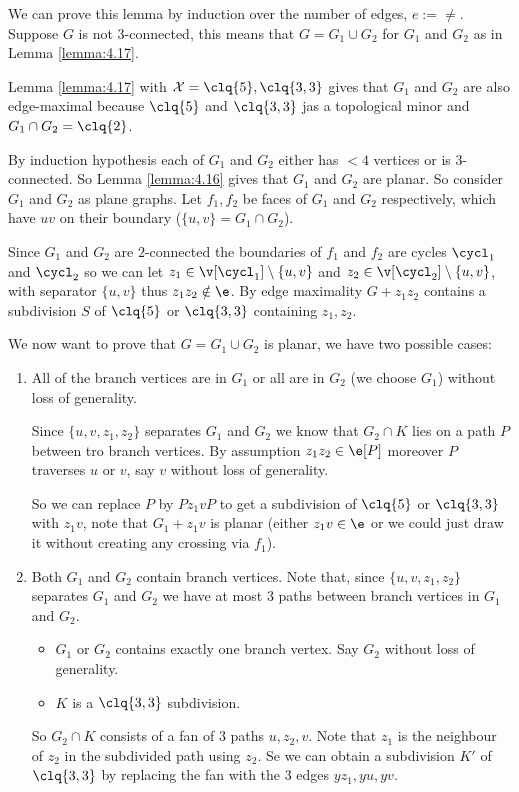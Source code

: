 \begin{prf}
    We can prove this lemma by induction over the number of edges, $e := \ne$. Suppose $G$ is not $3$-connected, this means that $G = G_1 \cup G_2$ for $G_1$ and $G_2$ as in Lemma \ref{lemma:4.17}.

    Lemma \ref{lemma:4.17} with $\mathcal{X} = {\clq{5}, \clq{3, 3}}$ gives that $G_1$ and $G_2$ are also edge-maximal because $\clq{5}$ and $\clq{3, 3}$ jas a topological minor and $G_1 \cap G_2 = \clq{2}$.

    By induction hypothesis each of $G_1$ and $G_2$ either has $< 4$ vertices or is $3$-connected. So Lemma \ref{lemma:4.16} gives that $G_1$ and $G_2$ are planar. So consider $G_1$ and $G_2$ as plane graphs. Let $f_1, f_2$ be faces of $G_1$ and $G_2$ respectively, which have $uv$ on their boundary ($\{u, v\} = G_1 \cap G_2$).

    Since $G_1$ and $G_2$ are $2$-connected the boundaries of $f_1$ and $f_2$ are cycles $\cycl_1$ and $\cycl_2$ so we can let $z_1 \in \v[\cycl_1] \setminus \{u, v\}$ and $z_2 \in \v[\cycl_2] \setminus \{u, v\}$, with separator $\{u, v\}$ thus $z_1z_2 \notin \e$. By edge maximality $G + z_1z_2$ contains a subdivision $S$ of $\clq{5}$ or $\clq{3, 3}$ containing $z_1, z_2$.
    
    
    We now want to prove that $G = G_1 \cup G_2$ is planar, we have two possible cases:
    \begin{enumerate}
        \item All of the branch vertices are in $G_1$ or all are in $G_2$ (we choose $G_1$) without loss of generality.

        Since $\{u, v, z_1, z_2\}$ separates $G_1$ and $G_2$ we know that $G_2 \cap K$ lies on a path $P$ between tro branch vertices. By assumption $z_1z_2 \in \e[P]$ moreover $P$ traverses $u$ or $v$, say $v$ without loss of generality.

        So we can replace $P$ by $Pz_1vP$ to get a subdivision of $\clq{5}$ or $\clq{3, 3}$ with $z_1v$, note that $G_1 + z_1v$ is planar (either $z_1v \in \e$ or we could just draw it without creating any crossing via $f_1$).
        \item Both $G_1$ and $G_2$ contain branch vertices. Note that, since $\{u, v, z_1, z_2\}$ separates $G_1$ and $G_2$ we have at most $3$ paths between branch vertices in $G_1$ and $G_2$.
        \begin{itemize}
            \item $G_1$ or $G_2$ contains exactly one branch vertex. Say $G_2$ without loss of generality.
            \item $K$ is a $\clq{3, 3}$ subdivision.
        \end{itemize}
        So $G_2 \cap K$ consists of a fan of $3$ paths $u, z_2, v$. Note that $z_1$ is the neighbour of $z_2$ in the subdivided path using $z_2$. Se we can obtain a subdivision $K'$ of $\clq{3, 3}$ by replacing the fan with the $3$ edges $yz_1, yu, yv$.


\end{enumerate}
\end{prf}
